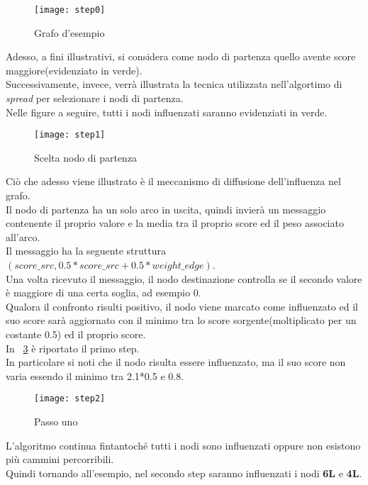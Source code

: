 \begin{figure}[!htbp]
  \begin{center}
    \texttt{[image: step0]}
  	\caption{Grafo d'esempio}
  	\label{step0}
  \end{center}
\end{figure}

\clearpage

Adesso, a fini illustrativi, si considera come nodo di partenza quello avente
score maggiore(evidenziato in verde).\\
Successivamente, invece, verrà illustrata la tecnica utilizzata nell'algortimo di \textit{spread}
per selezionare i nodi di partenza.\\
Nelle figure a seguire, tutti i nodi influenzati saranno evidenziati in verde.
\begin{figure}[!htbp]
  \begin{center}
    \texttt{[image: step1]}
  	\caption{Scelta nodo di partenza}
  	\label{step1}
  \end{center}
\end{figure}
\clearpage
Ciò che adesso viene illustrato è il meccanismo di diffusione dell'influenza nel
grafo.\\
Il nodo di partenza ha un solo arco in uscita, quindi invierà un messaggio contenente il proprio valore e
la media tra il proprio score ed il peso associato all'arco.\\
Il messaggio ha la seguente struttura $(score\_src, 0.5*score\_src+0.5*weight\_edge)$.\\
Una volta ricevuto il messaggio, il nodo destinazione controlla se il secondo valore è maggiore di una certa soglia,
ad esempio 0.\\
Qualora il confronto risulti positivo, il nodo viene marcato come influenzato ed il
suo score sarà aggiornato con il minimo tra lo score sorgente(moltiplicato per un costante 0.5) ed il proprio score.\\
In \figurename~\ref{step2} è riportato il primo step.\\In particolare si noti che il nodo
risulta essere influenzato, ma il suo score non varia essendo il minimo tra 2.1*0.5 e 0.8.

\begin{figure}[!htbp]
  \begin{center}
    \texttt{[image: step2]}
  	\caption{Passo uno}
  	\label{step2}
  \end{center}
\end{figure}
\clearpage
L'algoritmo continua fintantoché tutti i nodi sono influenzati oppure non esistono più cammini percorribili.\\
Quindi tornando all'esempio, nel secondo step saranno influenzati i nodi \textbf{6L} e \textbf{4L}.

